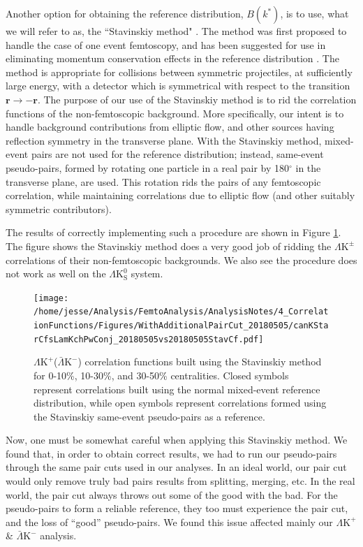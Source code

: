 \documentclass[ALICE,manyauthors]{cernphprep}
\newcommand{\LamKchP}{$\Lambda\mathrm{K^{+}}$\xspace}
\newcommand{\ALamKchM}{$\bar{\Lambda}\mathrm{K^{-}}$\xspace}
\newcommand{\LamKchPALamKchM}{$\Lambda\mathrm{K^{+}}$($\bar{\Lambda}\mathrm{K^{-}}$)\xspace}
\newcommand{\LamKpm}{$\Lambda\mathrm{K^{\pm}}$\xspace}
\newcommand{\LamKs}{$\Lambda\mathrm{K^{0}_{S}}$\xspace}
\begin{document}
Another option for obtaining the reference distribution, $B(k^{*})$, is to use, what we will refer to as, the ``Stavinskiy method" \cite{Stavinskiy04}.
The method was first proposed to handle the case of one event femtoscopy, and has been suggested for use in eliminating momentum conservation effects in the reference distribution \cite{Lisa:2005dd}.
The method is appropriate for collisions between symmetric projectiles, at sufficiently large energy, with a detector which is symmetrical with respect to the transition $\mathbf{r} \rightarrow \mathbf{-r}$.
The purpose of our use of the Stavinskiy method is to rid the correlation functions of the non-femtoscopic background.  
More specifically, our intent is to handle background contributions from elliptic flow, and other sources having reflection symmetry in the transverse plane.  
With the Stavinskiy method, mixed-event pairs are not used for the reference distribution; instead, same-event pseudo-pairs, formed by rotating one particle in a real pair by 180$^\circ$ in the transverse plane, are used.  
This rotation rids the pairs of any femtoscopic correlation, while maintaining correlations due to elliptic flow (and other suitably symmetric contributors).

The results of correctly implementing such a procedure are shown in Figure \ref{fig:StavCfs_Correct_LamKchP}.  
The figure shows the Stavinskiy method does a very good job of ridding the \LamKpm correlations of their non-femtoscopic backgrounds.  
We also see the procedure does not work as well on the \LamKs system.


\begin{figure}[h!]
  \centering
  \texttt{[image: /home/jesse/Analysis/FemtoAnalysis/AnalysisNotes/4\_CorrelationFunctions/Figures/WithAdditionalPairCut\_20180505/canKStarCfsLamKchPwConj\_20180505vs20180505StavCf.pdf]}
  \caption[\LamKchP Stavinskiy Correlation Functions]{\LamKchPALamKchM correlation functions built using the Stavinskiy method for 0-10\%, 10-30\%, and 30-50\% centralities.  Closed symbols represent correlations built using the normal mixed-event reference distribution, while open symbols represent correlations formed using the Stavinskiy same-event pseudo-pairs as a reference.}
  \label{fig:StavCfs_Correct_LamKchP}
\end{figure}

Now, one must be somewhat careful when applying this Stavinskiy method.  
We found that, in order to obtain correct results, we had to run our pseudo-pairs through the same pair cuts used in our analyses.  
In an ideal world, our pair cut would only remove truly bad pairs results from splitting, merging, etc.  
In the real world, the pair cut always throws out some of the good with the bad.  
For the pseudo-pairs to form a reliable reference, they too must experience the pair cut, and the loss of ``good'' pseudo-pairs.  
We found this issue affected mainly our \LamKchP \& \ALamKchM analysis.
\end{document}
